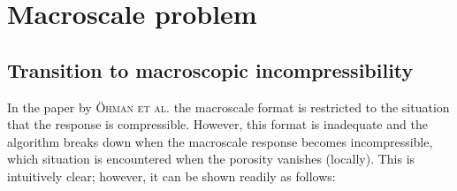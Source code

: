 \documentclass[10pt,a4paper,fleqn]{article}
\begin{document}
\section{Macroscale problem}\label{sec:macro}

\subsection{Transition to macroscopic incompressibility}

In the paper by \textsc{Öhman et al.} \cite{Ohman2011a} the macroscale format is restricted to the situation that the response is compressible. However, this format is inadequate and the algorithm breaks down when the macroscale response becomes incompressible, which situation is encountered when the porosity vanishes (locally). This is intuitively clear; however, it can be shown readily as follows:
\end{document}
